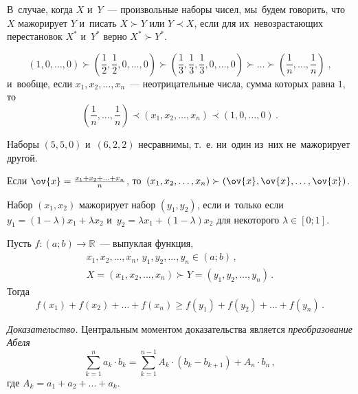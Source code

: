 В~случае, когда $X$ и~$Y$~--- произвольные наборы чисел, мы~будем говорить,
что $X$ мажорирует $Y$ и~писать $X\succ Y$ или $Y\prec X$, если для
их~невозрастающих перестановок $X^*$ и~$Y^*$ верно $X^*\succ Y^*$.

\[
    \left( 1, 0, \ldots, 0 \right)
\succ
    \left( \frac{1}{2}, \frac{1}{2}, 0, \ldots,0 \right)
\succ
    \left( \frac{1}{3}, \frac{1}{3}, \frac{1}{3}, 0, \ldots, 0 \right)
\succ\ldots\succ
    \left( \frac{1}{n}, \ldots, \frac{1}{n} \right)
\; , \]
и~вообще, если $x_1, x_2, \ldots, x_n$~--- неотрицательные числа, сумма
которых равна $1$, то%
\[
    \left( \frac{1}{n}, \ldots, \frac{1}{n} \right)
\prec
    \left( x_1, x_2, \ldots, x_n \right)
\prec
    \left( 1, 0, \ldots, 0 \right)
\, . \]

Наборы $(5, 5, 0)$ и~$(6, 2, 2)$ несравнимы, т.~е. ни~один из~них
не~мажорирует другой.

Если $\ov{x} = \frac{x_1 + x_2 + \ldots + x_n}{n}$,
то~$(x_1, x_2, \ldots, x_n) \succ (\ov{x}, \ov{x}, \ldots, \ov{x})$.

Набор $(x_1, x_2)$ мажорирует набор $(y_1, y_2)$, если и~только если
$y_1 = (1 - \lambda) x_1 + \lambda x_2$
и~$y_2 = \lambda x_1 + (1 - \lambda) x_2$
для некоторого $\lambda \in [0; 1]$.

\hrulefill

Пусть $f \colon (a; b) \to \mathbb{R}$~--- выпуклая функция,
\begin{gather*}
    x_1, x_2, \ldots, x_n, \, y_1, y_2, \ldots, y_n \in (a; b)
\, , \\
    X = (x_1, x_2, \ldots, x_n) \succ Y = (y_1, y_2, \ldots, y_n)
\, . \end{gather*}
Тогда
\[
    f(x_1) + f(x_2) + \ldots + f(x_n)
\geq
    f(y_1) + f(y_2) + \ldots + f(y_n)
\, . \]

\textit{Доказательство.}
Центральным моментом доказательства является \emph{преобразование Абеля}
\[
    \sum\limits_{k=1}^n
        a_k \cdot b_k
=
    \sum\limits_{k=1}^{n-1}
        A_k \cdot (b_k - b_{k+1}) + A_n \cdot b_n
\, , \]
где $A_k = a_1 + a_2 + \ldots + a_k$.

